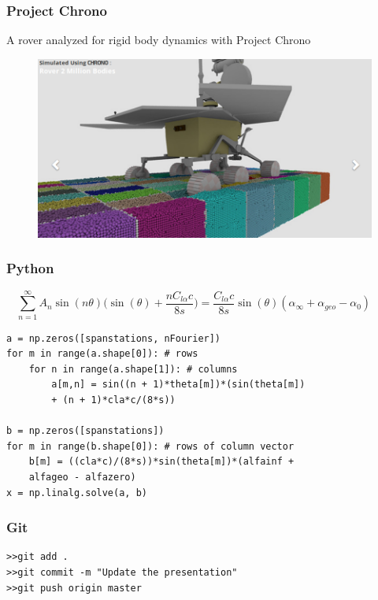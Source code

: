 \documentclass{beamer}
\begin{document}
\begin{frame}
\frametitle{Project Chrono}

A rover analyzed for rigid body dynamics with Project Chrono

\begin{figure}
\includegraphics[width=0.8\linewidth]{Pictures/ProjectChronoRover.png}
\end{figure}

\end{frame}


\begin{frame}[fragile] %
\frametitle{Python}
$$ 
\sum_{n=1}^\infty A_n \sin(n \theta) \bigg(  \sin(\theta) + \frac{n C_{l \alpha} c}{8 s} \bigg) = \frac{C_{l \alpha} c}{8 s} \sin(\theta) (\alpha_\infty + \alpha_{geo} - \alpha_0) \qquad 
$$
\begin{example}
\begin{verbatim}
a = np.zeros([spanstations, nFourier])
for m in range(a.shape[0]): # rows
    for n in range(a.shape[1]): # columns
        a[m,n] = sin((n + 1)*theta[m])*(sin(theta[m]) 
        + (n + 1)*cla*c/(8*s))

b = np.zeros([spanstations])
for m in range(b.shape[0]): # rows of column vector
    b[m] = ((cla*c)/(8*s))*sin(theta[m])*(alfainf + 
    alfageo - alfazero)
x = np.linalg.solve(a, b)
\end{verbatim}
\end{example}

\end{frame}


\begin{frame}[fragile] %
\frametitle{Git}

\begin{example}
\begin{verbatim}
>>git add .
>>git commit -m "Update the presentation"
>>git push origin master
\end{verbatim}
\end{example}

\end{frame}
\end{document}

